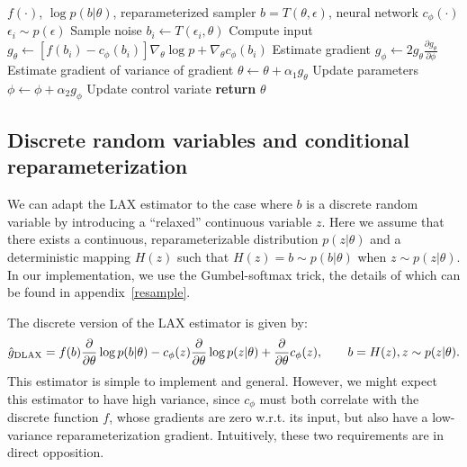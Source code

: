 \documentclass{article}
\newcommand{\PT}{\frac{\partial}{\partial \theta}}
\newcommand{\LAX}{{\textnormal{LAX}}}
\newcommand{\DLAX}{{\textnormal{DLAX}}}
\newcommand{\RELAX}{{\textnormal{RELAX}}}
\begin{document}
\begin{algorithm}[h]
\begin{algorithmic}
\Require $f(\cdot)$, $\log p(b|\theta)$, reparameterized sampler $b = T(\theta, \epsilon)$, neural network $c_\phi(\cdot)$
	\State $\epsilon_{i} \sim p(\epsilon)$ \Comment Sample noise
	\State $b_i \leftarrow T(\epsilon_i, \theta)$ \Comment Compute input
	\State  $g_\theta \leftarrow \left[f(b_i) - c_{\phi}(b_i) \right] \nabla_\theta \log p + \nabla_\theta c_\phi(b_i)$ \Comment Estimate gradient
	\State  $g_\phi \leftarrow 2 g_\theta \frac{\partial g_\theta}{\partial \phi}$ \Comment Estimate gradient of variance of gradient
	\State $\theta \leftarrow \theta + \alpha_1 g_\theta$ \Comment Update parameters
	\State $\phi \leftarrow \phi + \alpha_2 g_\phi$ \Comment Update control variate
\EndWhile
\State \textbf{return} $\theta$ 
\end{algorithmic}
\caption{\LAX{}: Optimizing parameters and a gradient control variate simultaneously.}
\label{lax}
\end{algorithm}

\subsection{Discrete random variables and conditional reparameterization}
We can adapt the \LAX{} estimator to the case where $b$ is a discrete random variable by introducing a ``relaxed'' continuous variable $z$. %
Here we assume that there exists a continuous, reparameterizable distribution $p(z|\theta)$ and a deterministic mapping $H(z)$ such that $H(z) = b \sim p(b|\theta)$ when $z \sim p(z|\theta)$.
In our implementation, we use the Gumbel-softmax trick, the details of which can be found in appendix~\ref{resample}.

The discrete version of the \LAX{} estimator is given by:
%
\begin{align}
\label{eq:discrete lax}
\hat g_\DLAX = f(b) \PT \log p(b|\theta) - c_\phi(z) \PT \log p(z|\theta) + \PT c_\phi(z), \qquad b = H(z), z \sim p(z|\theta).
\end{align}
%
This estimator is simple to implement and general.
However, we might expect this estimator to have high variance, since $c_\phi$ must both correlate with the discrete function $f$, whose gradients are zero w.r.t. its input, but also have a low-variance reparameterization gradient.
Intuitively, these two requirements are in direct opposition.
\end{document}
